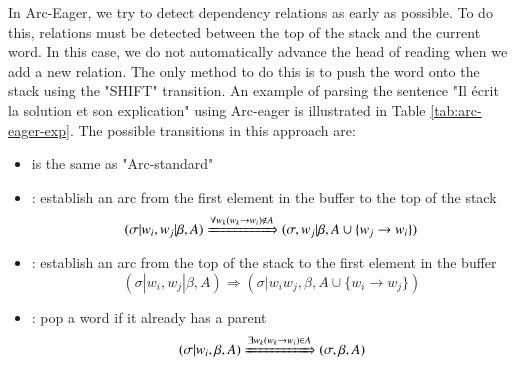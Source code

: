 \documentclass{KodeBook}
\begin{document}
In Arc-Eager, we try to detect dependency relations as early as possible. To do this, relations must be detected between the top of the stack and the current word. In this case, we do not automatically advance the head of reading when we add a new relation. The only method to do this is to push the word onto the stack using the "SHIFT" transition. An example of parsing the sentence "Il écrit la solution et son explication" using Arc-eager is illustrated in Table \ref{tab:arc-eager-exp}. The possible transitions in this approach are:
\begin{itemize}
	\item {} is the same as "Arc-standard"
	
	\item {}: establish an arc from the first element in the buffer to the top of the stack
	\[ (\sigma|w_i, w_j|\beta, A) \xRightarrow{\forall w_k (w_k \rightarrow w_i) \notin A}  (\sigma, w_j|\beta, A \cup \{w_j \rightarrow w_i \}) \] 
	
	\item {}: establish an arc from the top of the stack to the first element in the buffer
	\[ (\sigma|w_i, w_j|\beta, A) \Rightarrow  (\sigma|w_i w_j, \beta, A \cup \{w_i \rightarrow w_j \}) \] 
	
	\item {}: pop a word if it already has a parent
	\[ (\sigma|w_i, \beta, A) \xRightarrow{\exists w_k (w_k \rightarrow w_i) \in A} (\sigma, \beta, A) \] 
\end{itemize}
\end{document}
